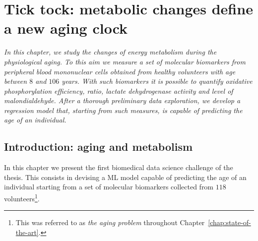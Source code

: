 
\chapter{Tick tock: metabolic changes define a new aging clock} \label{chap:frassoni}


\begin{displayquote}
	\textit{In this chapter, we study the changes of energy metabolism during the physiological aging. To this aim we measure a set of molecular biomarkers from peripheral blood mononuclear cells obtained from healthy volunteers with age between $8$ and $106$ years. With such biomarkers it is possible to quantify oxidative phosphorylation efficiency, \atpamp ratio, lactate dehydrogenase activity and level of malondialdehyde. After a thorough preliminary data exploration, we develop a regression model that, starting from such measures, is capable of predicting the age of an individual.}
\end{displayquote}

\section{Introduction: aging and metabolism} \label{sec:frassoni_intro}

In this chapter we present the first biomedical data science challenge of the thesis.
This consists in devising a ML model capable of predicting the age of an individual starting from a set of molecular biomarkers collected from $118$ volunteers\footnote{ This was referred to as \textit{the aging problem} throughout Chapter~\ref{chap:state-of-the-art}.}.

